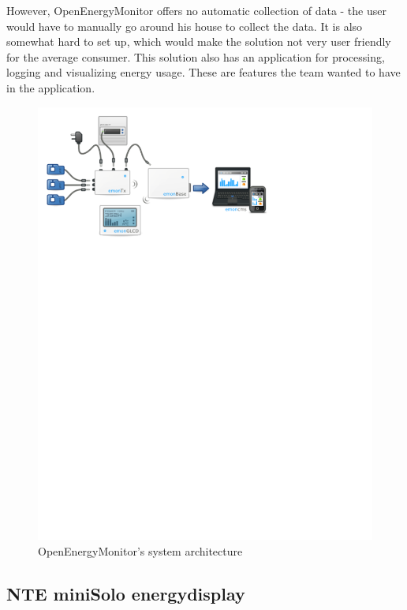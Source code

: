 However, OpenEnergyMonitor offers no automatic collection of data - the user would have to manually go around his house to collect the data. It is also somewhat hard to set up, which would make the solution not very user friendly for the average consumer. This solution also has an application for processing, logging and visualizing energy usage. These are features the team wanted to have in the application.

\setcounter{figure}{1}
\begin{figure}[H]
\centering
\includegraphics[width=\textwidth, trim=0.5cm 19cm 6.5cm 0cm, clip]{ch/prestudy/fig/OEM_system.pdf}
\caption{OpenEnergyMonitor's system architecture}
\label{fig:oem}
\end{figure}




\subsection{NTE miniSolo energydisplay}

